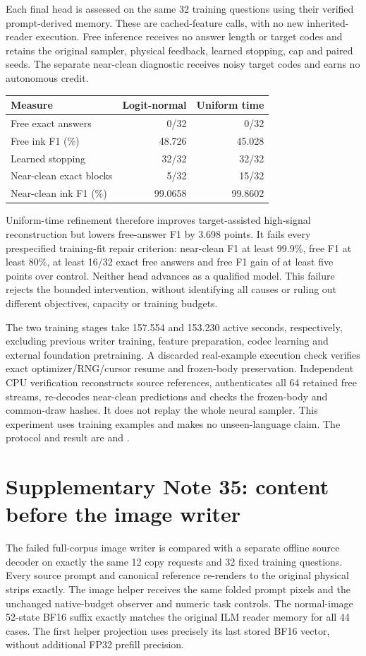 \documentclass[10pt,a4paper]{article}
\begin{document}
Each final head is assessed on the same 32 training questions using their
verified prompt-derived memory. These are cached-feature calls, with no new
inherited-reader execution. Free inference receives no answer length or
target codes and retains the original sampler, physical feedback, learned
stopping, cap and paired seeds. The separate near-clean diagnostic receives
noisy target codes and earns no autonomous credit.
\begin{center}\small
\begin{tabular}{lrr}
\toprule
Measure & Logit-normal & Uniform time\\
\midrule
Free exact answers & 0/32 & 0/32\\
Free ink F1 (\%) & 48.726 & 45.028\\
Learned stopping & 32/32 & 32/32\\
Near-clean exact blocks & 5/32 & 15/32\\
Near-clean ink F1 (\%) & 99.0658 & 99.8602\\
\bottomrule
\end{tabular}
\end{center}
Uniform-time refinement therefore improves target-assisted high-signal
reconstruction but lowers free-answer F1 by 3.698 points. It fails every
prespecified training-fit repair criterion: near-clean F1 at least 99.9\%,
free F1 at least 80\%, at least 16/32 exact free answers and free F1 gain
of at least five points over control. Neither head advances as a qualified
model. This failure rejects the bounded intervention, without identifying
all causes or ruling out different objectives, capacity or training budgets.

The two training stages take 157.554 and 153.230 active seconds, respectively,
excluding previous writer training, feature preparation, codec learning and
external foundation pretraining. A discarded real-example execution check
verifies exact optimizer/RNG/cursor resume and frozen-body preservation.
Independent CPU verification reconstructs source references, authenticates
all 64 retained free streams, re-decodes near-clean predictions and checks
the frozen-body and common-draw hashes. It does not replay the whole neural
sampler. This experiment uses training examples and makes no unseen-language
claim. The protocol and result are
 and
.

\section*{Supplementary Note 35: content before the image writer}
The failed full-corpus image writer is compared with a separate offline source
decoder on exactly the same 12 copy requests and 32 fixed training questions.
Every source prompt and canonical reference re-renders to the original
physical strips exactly. The image helper receives the same folded prompt
pixels and the unchanged native-budget observer and numeric task controls.
The normal-image 52-state BF16 suffix exactly matches the original ILM reader
memory for all 44 cases. The first helper projection uses precisely its last
stored BF16 vector, without additional FP32 prefill precision.
\end{document}
